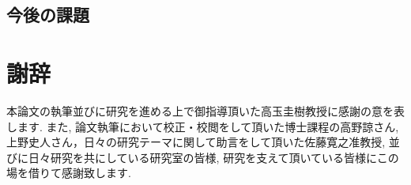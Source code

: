 \documentclass[a4j,11pt]{jarticle}
\def\proposed{DNRBA}
\begin{document}
\subsection{今後の課題}
\label{ss:END_future}


\clearpage
\pagestyle{plain}
\section*{謝辞}
本論文の執筆並びに研究を進める上で御指導頂いた高玉圭樹教授に感謝の意を表します. 
また, 論文執筆において校正・校閲をして頂いた博士課程の高野諒さん,上野史人さん，日々の研究テーマに関して助言をして頂いた佐藤寛之准教授, 並びに日々研究を共にしている研究室の皆様, 研究を支えて頂いている皆様にこの場を借りて感謝致します. 
\end{document}
